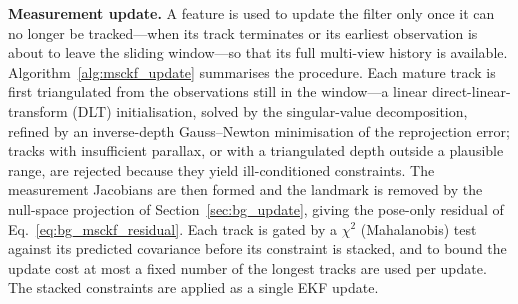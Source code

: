 \textbf{Measurement update.} A feature is used to update the filter only once it can no longer be tracked---when its track terminates or its earliest observation is about to leave the sliding window---so that its full multi-view history is available. Algorithm~\ref{alg:msckf_update} summarises the procedure. Each mature track is first triangulated from the observations still in the window---a linear direct-linear-transform (DLT) initialisation, solved by the singular-value decomposition, refined by an inverse-depth Gauss--Newton minimisation of the reprojection error; tracks with insufficient parallax, or with a triangulated depth outside a plausible range, are rejected because they yield ill-conditioned constraints. The measurement Jacobians are then formed and the landmark is removed by the null-space projection of Section~\ref{sec:bg_update}, giving the pose-only residual of Eq.~\ref{eq:bg_msckf_residual}. Each track is gated by a $\chi^2$ (Mahalanobis) test against its predicted covariance before its constraint is stacked, and to bound the update cost at most a fixed number of the longest tracks are used per update. The stacked constraints are applied as a single EKF update.

